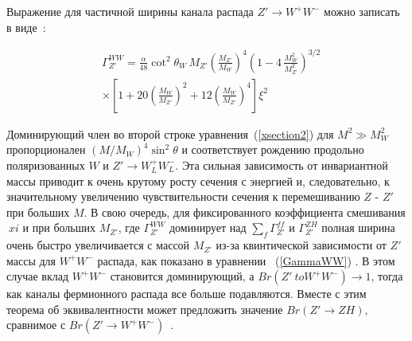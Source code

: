 Выражение для частичной ширины канала распада $ Z '\to W ^ + W ^ - $ можно записать в виде~\cite{2part-pankov}:

\begin{align}
&\Gamma_{Z'}^{WW}=\frac{\alpha}{48}\cot^2\theta_W\, M_{Z'}
\left(\frac{M_{Z'}}{M_W}\right)^4\left(1-4\,\frac{M_W^2}{M_{Z'}^2}\right)^{3/2} \nonumber \\
& \times \left[ 1+20 \left(\frac{M_W}{M_{Z'}}\right)^2 + 12
\left(\frac{M_W}{M_{Z'}}\right)^4\right]\xi^2 \label{GammaWW}
\end{align}

Доминирующий член во второй строке уравнения~(\ref{xsection2}) для $ M ^ 2 \gg M_W ^ 2 $ пропорционален $ (M / M_W) ^ 4 \sin ^ 2 \theta $ и соответствует рождению продольно поляризованных $ W $ и $ Z'\to W^+_LW^-_L $. Эта сильная зависимость от инвариантной массы приводит к очень крутому росту сечения с энергией и, следовательно, к значительному увеличению чувствительности сечения к перемешиванию $ Z $ - $ Z '$ при больших $ M $. В свою очередь, для фиксированного коэффициента смешивания $ \ xi $ и при больших $ M_ {Z '} $, где $ \Gamma_ {Z'} ^ {WW} $ доминирует над $ \sum_f \Gamma_ {Z '} ^ {ff } $ и $ \Gamma_ {Z '} ^ {ZH} $ полная ширина очень быстро увеличивается с массой $ M_ {Z'} $ из-за квинтической зависимости от $ Z '$ массы для $ W ^ + W ^ - $ распада, как показано в уравнении ~(\ref{GammaWW})
\cite{2part-pankov}. В этом случае вклад $ W ^ + W ^ - $ становится доминирующий, а $ {Br} (Z '\ to W ^ + W ^ -) \to 1 $, тогда как каналы фермионного распада все больше подавляются. Вместе с этим теорема об эквивалентности может предложить значение $ {Br} (Z'\to ZH) $, сравнимое с $ {Br} (Z' \to W ^ + W ^ -) $~\cite{2part-pankov}.